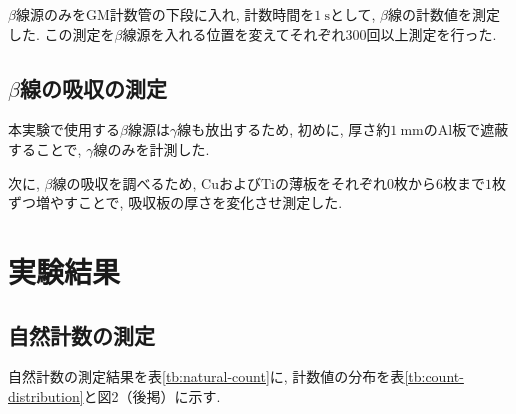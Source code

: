 \documentclass{jarticle}
\begin{document}
$\beta$線源のみをGM計数管の下段に入れ, 計数時間を$1\ \mathrm{s}$として, $\beta$線の計数値を測定した.
この測定を$\beta$線源を入れる位置を変えてそれぞれ$300$回以上測定を行った.


\subsection{$\beta$線の吸収の測定}

本実験で使用する$\beta$線源は$\gamma$線も放出するため, 初めに, 厚さ約$1\ \mathrm{mm}$の$\mathrm{Al}$板で遮蔽することで, $\gamma$線のみを計測した.

次に, $\beta$線の吸収を調べるため, $\mathrm{Cu}$および$\mathrm{Ti}$の薄板をそれぞれ$0$枚から$6$枚まで$1$枚ずつ増やすことで, 吸収板の厚さを変化させ測定した.



\section{実験結果}


\subsection{自然計数の測定}

自然計数の測定結果を表\ref{tb:natural-count}に, 計数値の分布を表\ref{tb:count-distribution}と図2（後掲）に示す.
\end{document}
